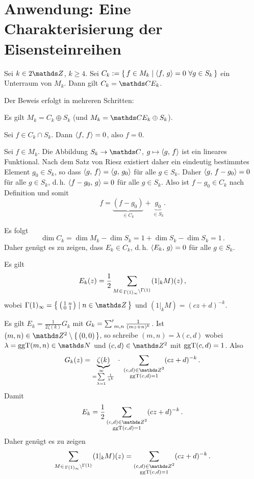 \section{Anwendung: Eine Charakterisierung der Eisensteinreihen}

\begin{satz}\label{CharEk}
	Sei $k \in 2\ZZ$, $k \geq 4$. Sei $C_k := \Set{f \in M_k \mid \scalarprd{f}{g} = 0 \ \forall g \in S_k}$ ein Unterraum von $M_k$.
	Dann gilt $C_k = \CC E_k$.
\end{satz}


\begin{bewe}

	Der Beweis erfolgt in mehreren Schritten:
	\vspace{-2em}

\begin{lemm}
	Es gilt $M_k = C_k \oplus S_k$ (und $M_k = \CC E_k \oplus S_k$).
\end{lemm}

\begin{bewe}
	Sei $f \in C_k \cap S_k$. Dann $\scalarprd ff = 0$, also $f = 0$.
	
	Sei $f \in M_k$.
	Die Abbildung $S_k \ra \CC$, $g \mapsto \scalarprd gf$ ist ein lineares Funktional.
	Nach dem Satz von Riesz existiert daher ein eindeutig bestimmtes Element $g_0 \in S_k$, so dass $\scalarprd gf = \scalarprd g{g_0}$ für alle $g \in S_k$.
	Daher $\scalarprd g{f-g_0} = 0$ für alle $g\in S_k$, d.\,h. $\scalarprd {f-g_0}g = 0$ für alle $g \in S_k$.
	Also ist $f-g_0 \in C_k$ nach Definition und somit
	\[
		f = \underbrace{(f-g_0)}_{\in C_k} + \underbrace{g_0}_{\in S_k} .
	\]
\end{bewe}

Es folgt
\[
	\dim C_k = \dim M_k - \dim S_k = 1 + \dim S_k - \dim S_k = 1\,.
\]
Daher genügt es zu zeigen, dass $E_k \in C_k$, d.\,h. $\scalarprd{E_k}g = 0$ für alle $g \in S_k$.

\begin{lemm}\label{Ek_per_Gamma(1)infty}
	Es gilt
	\[
		E_k(z) = \frac{1}{2} \sum_{M \in \linksmodulo{\Gamma(1)_\infty}{\Gamma(1)}} (1|_k M)(z)\,,
	\]
	wobei $\Gamma(1)_\infty = \Set{\mymat 1n01 \mid n \in \ZZ}$ und $(1|_k M) = (cz+d)^{-k}$.
\end{lemm}

\begin{bewe}
	Es gilt $E_k = \frac{1}{2\zeta(k)} G_k$ mit $G_k = \sumprime_{m,n} \frac{1}{(mz+n)^k}$.
	Ist $(m,n) \in \ZZ^2\setminus\Set{(0,0)}$, so schreibe $(m,n) = \lambda (c,d)$ wobei $\lambda = \ggt(m,n) \in \NN$ und $(c,d) \in \ZZ^2$ mit $\operatorname{ggT}(c,d) = 1$.
	Also
	\[
		G_k(z)
		= \underbrace{\zeta(k)}_{= \sum\limits_{\lambda=1}^\infty \frac{1}{\lambda^k}}\ \cdot\ \sum_{\substack{(c,d) \in \ZZ^2 \\ \ggt(c,d) = 1}} (cz+d)^{-k}
		\,.
	\]
	Damit
	\[
		E_k = \frac{1}{2} \sum_{\substack{(c,d) \in \ZZ^2 \\ \ggt(c,d) = 1}} (cz+d)^{-k}
		\,.
	\]
	Daher genügt es zu zeigen
	\[
		\sum_{M \in \linksmodulo{\Gamma(1)_\infty}{\Gamma(1)}} (1|_k M)(z)
		= \sum_{\substack{(c,d) \in \ZZ^2 \\ \ggt(c,d) = 1}} (cz+d)^{-k}
		\,.
	\]
	

\end{bewe}
\end{bewe}
